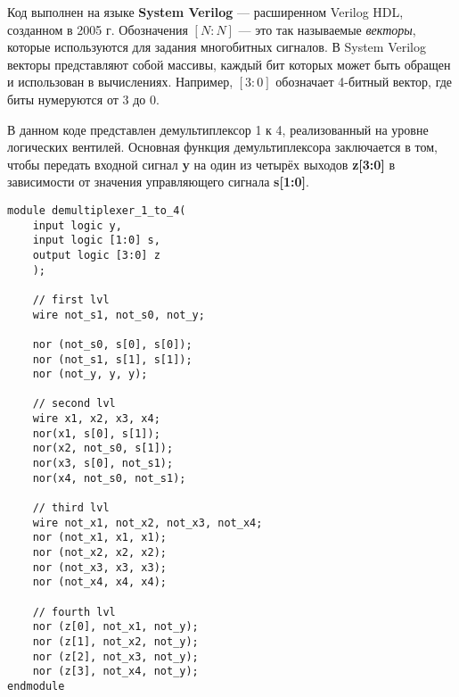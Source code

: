 Код выполнен на языке \textbf{System Verilog} — расширенном Verilog HDL, созданном в 2005 г. Обозначения $[N:N]$ — это так называемые \textit{векторы}, которые используются для задания многобитных сигналов. В System Verilog векторы представляют собой массивы, каждый бит которых может быть обращен и использован в вычислениях. Например, $[3:0]$ обозначает 4-битный вектор, где биты нумеруются от 3 до 0.

В данном коде представлен демультиплексор 1 к 4, реализованный на уровне логических вентилей. Основная функция демультиплексора заключается в том, чтобы передать входной сигнал \textbf{y} на один из четырёх выходов \textbf{z[3:0]} в зависимости от значения управляющего сигнала \textbf{s[1:0]}.

\begin{lstlisting}
module demultiplexer_1_to_4(
    input logic y,
    input logic [1:0] s,
    output logic [3:0] z
    );

    // first lvl
    wire not_s1, not_s0, not_y;

    nor (not_s0, s[0], s[0]);
    nor (not_s1, s[1], s[1]);
    nor (not_y, y, y);
    
    // second lvl
    wire x1, x2, x3, x4;
    nor(x1, s[0], s[1]);
    nor(x2, not_s0, s[1]);
    nor(x3, s[0], not_s1);
    nor(x4, not_s0, not_s1);
    
    // third lvl
    wire not_x1, not_x2, not_x3, not_x4;
    nor (not_x1, x1, x1);
    nor (not_x2, x2, x2);
    nor (not_x3, x3, x3);
    nor (not_x4, x4, x4);
    
    // fourth lvl
    nor (z[0], not_x1, not_y);
    nor (z[1], not_x2, not_y);
    nor (z[2], not_x3, not_y);
    nor (z[3], not_x4, not_y);
endmodule
\end{lstlisting}
